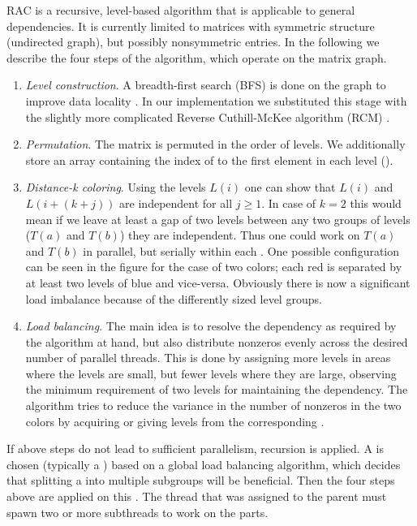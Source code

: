 RAC is a recursive, level-based algorithm that is applicable to
general \DK dependencies. It is currently limited to matrices
with symmetric structure (undirected graph), but possibly nonsymmetric
entries. In the following we describe the four steps of the
algorithm, which operate on the matrix graph.
\begin{enumerate}
\item \emph{Level construction}.  A breadth-first search (BFS)
  \cite{BFS} is done on the graph to improve data locality
  \cite{RCM_Sparse_computation}. In our implementation we substituted
  this stage with the slightly more complicated Reverse Cuthill-McKee
  algorithm (RCM) \cite{RCM}.
		
\item \emph{Permutation}. The matrix is permuted in the order of
  levels.  We additionally store an array containing the index
  of to the first element in each level (\levelPtr).
		
\item \emph{Distance-k coloring}. Using the levels $L(i)$ one can
  show that $L(i)$ and $L(i+(k+j))$ are \DK independent
  for all $j\geq1$. In case of $k=2$ this would mean if we
  leave at least a gap of two levels between any two groups of levels
  ($T(a)$ and $T(b)$) they are \DTWO independent. Thus
  one could work on $T(a)$ and $T(b)$ in parallel, but
  serially within each \levelGroup. One possible
  configuration can be seen in the figure for the case of two colors;
  each red \levelGroup is separated by at least two
  levels of blue and vice-versa. Obviously there is now
  a significant load imbalance because of the differently sized
  level groups.
  		
\item \emph{Load balancing}. The main idea is to resolve the \DK
  dependency as required by the algorithm at hand, but also distribute
  nonzeros evenly across the desired number of parallel threads.  This
  is done by assigning more levels in areas where the levels are
  small, but fewer levels where they are large, observing the minimum
  requirement of two levels for maintaining the \DTWO dependency.
  The algorithm tries to reduce the variance in the number of nonzeros
  in the two colors by acquiring or giving levels from the
  corresponding \levelGroup.
\end{enumerate}
If above steps do not lead to sufficient parallelism, recursion is
applied. A \subgraph is chosen  (typically a \levelGroup) based
on a global load balancing algorithm, which decides that splitting
a \levelGroup into multiple subgroups will be beneficial. Then
the four steps above are applied on this \subgraph. The thread
that was assigned to the parent \subgraph must spawn two or more
subthreads to work on the parts. 

